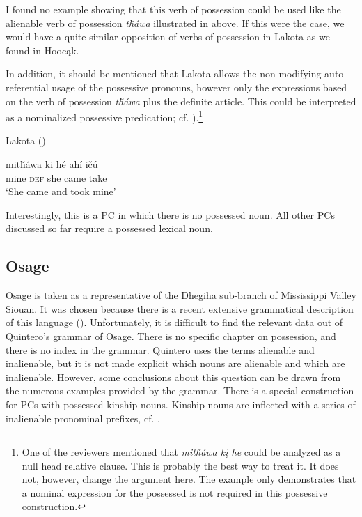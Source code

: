 \documentclass[output=paper]{LSP/langsci}
\begin{document}
I found no example showing that this verb of possession could be used like the alienable verb of possession \textit{t\v{h}\'awa} illustrated in  above. If this were the case, we would have a quite similar opposition of verbs of possession in Lakota as we found in Hoocąk. 

In addition, it should be mentioned that Lakota allows the non-modifying auto-referential usage of the possessive pronouns, however only the expressions based on the verb of possession \textit{t\v{h}\'awa} plus the definite article. This could be interpreted as a nominalized possessive predication; cf. ).\footnote{One of the reviewers mentioned that \textit{mit\v{h}áwa kį he} could be analyzed as a null head relative clause. This is probably the best way to treat it. It does not, however, change the argument here. The example only demonstrates that a nominal expression for the possessed is not required in this possessive construction.}

\ea	Lakota (\citealt[22]{Buechel1939}) \label{lakotatookmine}

\gll mit\v{h}áwa ki      h\'e   ahí     i\v{c}ú \\
mine        \textsc{def} she came take \\
\glt `She came and took mine'
\z

Interestingly, this is a PC in which there is no possessed noun. All other PCs discussed so far require a possessed lexical noun.

\subsection{Osage}\label{sec:helmbrecht:4.5}
Osage is taken as a representative of the Dhegiha sub-branch of Mississippi Valley Siouan. It was chosen because there is a recent extensive grammatical description of this language (\citealt{Quintero2004}). Unfortunately, it is difficult to find the relevant data out of Quintero's grammar of Osage. There is no specific chapter on possession, and there is no index in the grammar. Quintero uses the terms alienable and inalienable, but it is not made explicit which nouns are alienable and which are inalienable. However, some conclusions about this question can be drawn from the numerous examples provided by the grammar.
There is a special construction for PCs with possessed kinship nouns. Kinship nouns are inflected with a series of inalienable pronominal prefixes, cf. .
\end{document}
